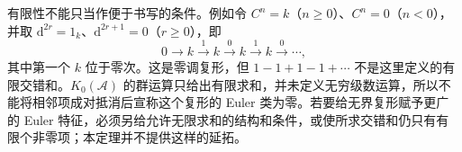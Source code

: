 有限性不能只当作便于书写的条件。例如令 \(C^n=k\)（\(n\ge0\)）、\(C^n=0\)（\(n<0\)），并取 \(\mathrm{d}^{2r}=1_k\)、\(\mathrm{d}^{2r+1}=0\)（\(r\ge0\)），即
\[
	0\to k\xrightarrow{1}k\xrightarrow{0}k\xrightarrow{1}k\xrightarrow{0}\cdots,
\]
其中第一个 \(k\) 位于零次。这是零调复形，但 \(1-1+1-1+\cdots\) 不是这里定义的有限交错和。\(K_0(\mathcal A)\) 的群运算只给出有限求和，并未定义无穷级数运算，所以不能将相邻项成对抵消后宣称这个复形的 Euler 类为零。若要给无界复形赋予更广的 Euler 特征，必须另给允许无限求和的结构和条件，或使所求交错和仍只有有限个非零项；本定理并不提供这样的延拓。
